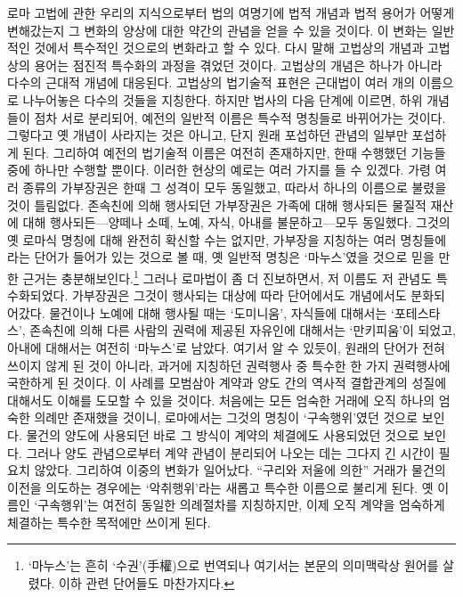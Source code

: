 로마 고법에 관한 우리의 지식으로부터
법의 여명기에 법적 개념과 법적 용어가 어떻게 변해갔는지
그 변화의 양상에 대한 약간의 관념을 얻을 수 있을 것이다.
이 변화는 일반적인 것에서 특수적인 것으로의 변화라고 할 수 있다.
다시 말해 고법상의 개념과 고법상의 용어는 점진적 특수화의 과정을
겪었던 것이다.
고법상의 개념은 하나가 아니라 다수의 근대적 개념에 대응된다.
고법상의 법기술적 표현은 근대법이 여러 개의 이름으로 나누어놓은
다수의 것들을 지칭한다.
하지만 법사의 다음 단계에 이르면,
하위 개념들이 점차 서로 분리되어,
예전의 일반적 이름은 특수적 명칭들로 바뀌어가는 것이다.
그렇다고 옛 개념이 사라지는 것은 아니고,
단지 원래 포섭하던 관념의 일부만 포섭하게 된다.
그리하여 예전의 법기술적 이름은 여전히 존재하지만,
한때 수행했던 기능들 중에 하나만 수행할 뿐이다.
이러한 현상의 예로는 여러 가지를 들 수 있겠다.
가령 여러 종류의 가부장권은 한때
그 성격이 모두 동일했고,
따라서 하나의 이름으로 불렸을 것이 틀림없다.
존속친에 의해 행사되던 가부장권은
가족에 대해 행사되든 물질적 재산에 대해 행사되든---양떼나 소떼, 노예,
자식, 아내를 불문하고---모두 동일했다.
그것의 옛 로마식 명칭에 대해 완전히 확신할 수는 없지만,
가부장을 지칭하는 여러 명칭들에
라는 단어가 들어가 있는 것으로 볼 때,
옛 일반적 명칭은 `마누스'였을 것으로 믿을 만한 근거는 충분해보인다.\footnote{%
  `마누스'는 흔히 `수권'(手權)으로 번역되나 여기서는 본문의 의미맥락상
  원어를 살렸다.
  이하 관련 단어들도 마찬가지다.
}
그러나 로마법이 좀 더 진보하면서,
저 이름도 저 관념도 특수화되었다.
가부장권은
그것이 행사되는 대상에 따라
단어에서도 개념에서도 분화되어갔다.
물건이나 노예에 대해 행사될 때는
`도미니움',
자식들에 대해서는 `포테스타스',
존속친에 의해 다른 사람의 권력에 제공된 자유인에 대해서는
`만키피움'이 되었고,
아내에 대해서는 여전히 `마누스'로 남았다.
여기서 알 수 있듯이,
원래의 단어가 전혀 쓰이지 않게 된 것이 아니라,
과거에 지칭하던 권력행사 중 특수한 한 가지 권력행사에 국한하게 된 것이다.
이 사례를 모범삼아 계약과 양도 간의 역사적 결합관계의 성질에 대해서도
이해를 도모할 수 있을 것이다.
처음에는 모든 엄숙한 거래에 오직 하나의 엄숙한 의례만
존재했을 것이니,
로마에서는 그것의 명칭이 `구속행위'였던 것으로 보인다.
물건의 양도에 사용되던 바로 그 방식이
계약의 체결에도 사용되었던 것으로 보인다.
그러나 양도 관념으로부터 계약 관념이 분리되어 나오는 데는
그다지 긴 시간이 필요치 않았다.
그리하여 이중의 변화가 일어났다.
``구리와 저울에 의한'' 거래가
물건의 이전을 의도하는 경우에는
`악취행위'라는 새롭고 특수한 이름으로 불리게 된다.
옛 이름인 `구속행위'는 여전히 동일한 의례절차를 지칭하지만,
이제
오직 계약을 엄숙하게 체결하는 특수한 목적에만 쓰이게 된다.

